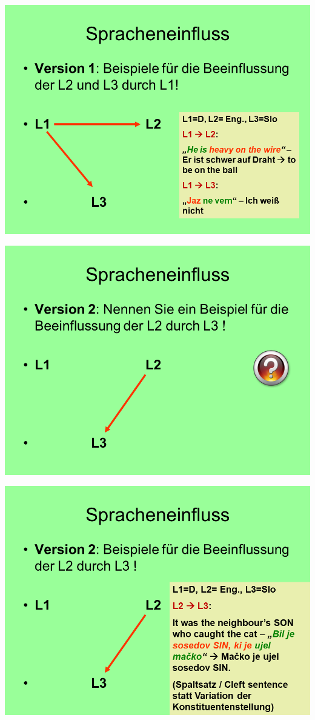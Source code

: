 \documentclass[
  letterpaper,
]{scrbook}
\begin{document}
\includegraphics[width=1\textwidth,height=\textheight]{./pictures/02_Spracheneinfluss_Sprachentrennung/Diapozitiv5.PNG}

\includegraphics[width=1\textwidth,height=\textheight]{./pictures/02_Spracheneinfluss_Sprachentrennung/Diapozitiv6.PNG}

\includegraphics[width=1\textwidth,height=\textheight]{./pictures/02_Spracheneinfluss_Sprachentrennung/Diapozitiv7.PNG}
\end{document}

